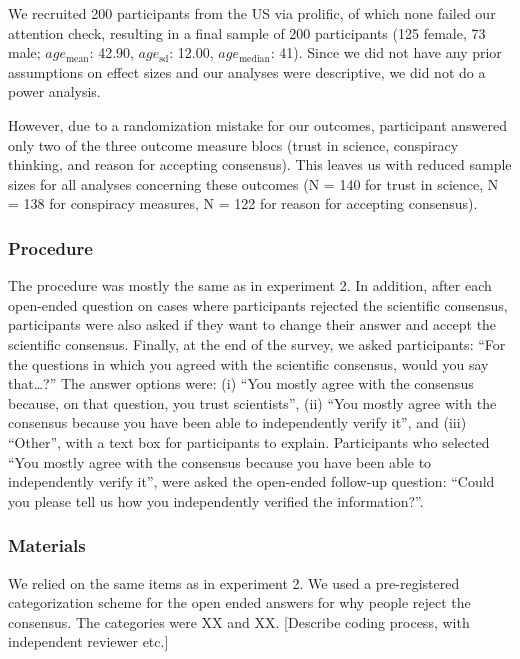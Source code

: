 \documentclass[
  doc,floatsintext]{apa6}
\begin{document}
We recruited 200 participants from the US via prolific, of which none failed our attention check, resulting in a final sample of 200 participants (125 female, 73 male; \(age_\text{mean}\): 42.90, \(age_\text{sd}\): 12.00, \(age_\text{median}\): 41). Since we did not have any prior assumptions on effect sizes and our analyses were descriptive, we did not do a power analysis.

However, due to a randomization mistake for our outcomes, participant answered only two of the three outcome measure blocs (trust in science, conspiracy thinking, and reason for accepting consensus). This leaves us with reduced sample sizes for all analyses concerning these outcomes (N = 140 for trust in science, N = 138 for conspiracy measures, N = 122 for reason for accepting consensus).

\subsubsection{Procedure}\label{procedure-2}

The procedure was mostly the same as in experiment 2. In addition, after each open-ended question on cases where participants rejected the scientific consensus, participants were also asked if they want to change their answer and accept the scientific consensus. Finally, at the end of the survey, we asked participants: ``For the questions in which you agreed with the scientific consensus, would you say that\ldots?'' The answer options were: (i) ``You mostly agree with the consensus because, on that question, you trust scientists'', (ii) ``You mostly agree with the consensus because you have been able to independently verify it'', and (iii) ``Other'', with a text box for participants to explain. Participants who selected ``You mostly agree with the consensus because you have been able to independently verify it'', were asked the open-ended follow-up question: ``Could you please tell us how you independently verified the information?''.

\subsubsection{Materials}\label{materials-2}

We relied on the same items as in experiment 2. We used a pre-registered categorization scheme for the open ended answers for why people reject the consensus. The categories were XX and XX. {[}Describe coding process, with independent reviewer etc.{]}
\end{document}
